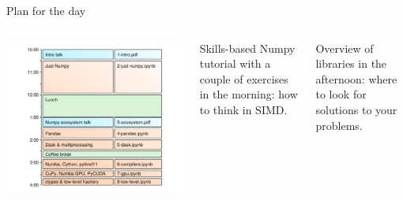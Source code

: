 \documentclass[aspectratio=169]{beamer}
\begin{document}
\begin{frame}{Plan for the day}
\large
\begin{columns}
\includegraphics[width=\linewidth]{../img/plan-for-the-day.png}

Skills-based Numpy tutorial with a couple of exercises in the morning: how to think in SIMD.

\vspace{1 cm}
Overview of libraries in the afternoon: where to look for solutions to your problems.
\end{columns}
\end{frame}
\end{document}
